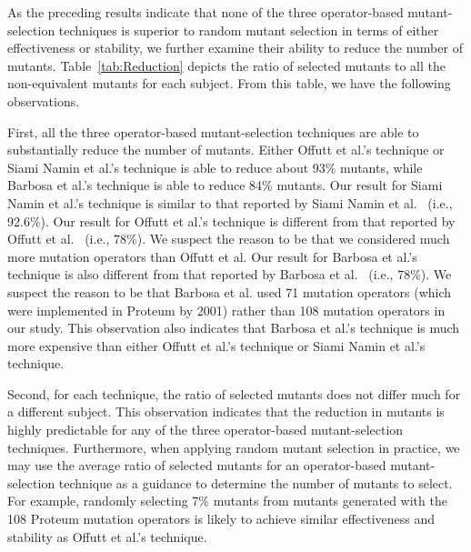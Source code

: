 As the preceding results indicate that none of the three
operator-based mutant-selection techniques is superior to random
mutant selection in terms of either effectiveness or stability, we
further examine their ability to reduce the number of mutants.
Table~\ref{tab:Reduction} depicts the ratio of selected mutants to
all the non-equivalent mutants for each subject. From this table,
we have the following observations.

First, all the three operator-based mutant-selection techniques
are able to substantially reduce the number of mutants. Either
Offutt et al.'s technique or Siami Namin et al.'s technique is
able to reduce about 93\% mutants, while Barbosa et al.'s
technique is able to reduce 84\% mutants. Our result for Siami
Namin et al.'s technique is similar to that reported by Siami
Namin et al.~\cite{SiamiNamin:08} (i.e., 92.6\%). Our result for
Offutt et al.'s technique is different from that reported by
Offutt et al.~\cite{Offutt:96} (i.e., 78\%). We suspect the reason
to be that we considered much more mutation operators than Offutt
et al. Our result for Barbosa et al.'s technique is also different
from that reported by Barbosa et al.~\cite{Barbosa:01} (i.e.,
78\%). We suspect the reason to be that Barbosa et al. used 71
mutation operators (which were implemented in Proteum by 2001)
rather than 108 mutation operators in our study. This observation
also indicates that Barbosa et al.'s technique is much more
expensive than either Offutt et al.'s technique or Siami Namin et
al.'s technique.

Second, for each technique, the ratio of selected mutants does not
differ much for a different subject. This observation indicates
that the reduction in mutants is highly predictable for any of the
three operator-based mutant-selection techniques. Furthermore,
when applying random mutant selection in practice, we may use the
average ratio of selected mutants for an operator-based
mutant-selection technique as a guidance to determine the number
of mutants to select. For example, randomly selecting 7\% mutants
from mutants generated with the 108 Proteum mutation operators is
likely to achieve similar effectiveness and stability as Offutt et
al.'s technique.

